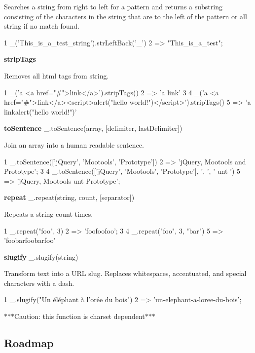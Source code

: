 Searches a string from right to left for a pattern and returns a substring consisting of the characters in the string that are to the left of the pattern or all string if no match found.


\begin{DoxyCode}
1 \_('This\_is\_a\_test\_string').strLeftBack('\_')
2 => "This\_is\_a\_test";
\end{DoxyCode}


{\bfseries strip\+Tags}

Removes all html tags from string.


\begin{DoxyCode}
1 \_('a <a href="#">link</a>').stripTags()
2 => 'a link'
3 
4 \_('a <a href="#">link</a><script>alert("hello world!")</script>').stripTags()
5 => 'a linkalert("hello world!")'
\end{DoxyCode}


{\bfseries to\+Sentence} \+\_\+.\+to\+Sentence(array, \mbox{[}delimiter, last\+Delimiter\mbox{]})

Join an array into a human readable sentence.


\begin{DoxyCode}
1 \_.toSentence(['jQuery', 'Mootools', 'Prototype'])
2 => 'jQuery, Mootools and Prototype';
3 
4 \_.toSentence(['jQuery', 'Mootools', 'Prototype'], ', ', ' unt ')
5 => 'jQuery, Mootools unt Prototype';
\end{DoxyCode}


{\bfseries repeat} \+\_\+.\+repeat(string, count, \mbox{[}separator\mbox{]})

Repeats a string count times.


\begin{DoxyCode}
1 \_.repeat("foo", 3)
2 => 'foofoofoo';
3 
4 \_.repeat("foo", 3, "bar")
5 => 'foobarfoobarfoo'
\end{DoxyCode}


{\bfseries slugify} \+\_\+.\+slugify(string)

Transform text into a U\+R\+L slug. Replaces whitespaces, accentuated, and special characters with a dash.


\begin{DoxyCode}
1 \_.slugify("Un éléphant à l'orée du bois")
2 => 'un-elephant-a-loree-du-bois';
\end{DoxyCode}


$\ast$$\ast$$\ast$\+Caution\+: this function is charset dependent$\ast$$\ast$$\ast$

\subsection*{Roadmap}


